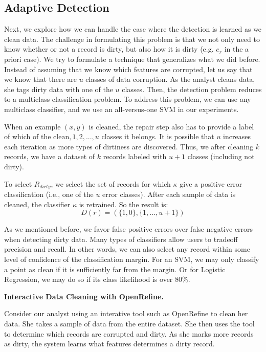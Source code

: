 \subsection{Adaptive Detection}
Next, we explore how we can handle the case where the detection is learned as we clean data.
The challenge in formulating this problem is that we not only need to know whether or not a record is dirty, but also how it is dirty (e.g. $e_r$ in the a priori case).
We try to formulate a technique that generalizes what we did before.
Instead of assuming that we know which features are corrupted, let us say that we know that there are $u$ classes of data corruption.
As the analyst cleans data, she tags dirty data with one of the $u$ classes.
Then, the detection problem reduces to a multiclass classification problem.
To address this problem, we can use any multiclass classifier, and we use an all-versus-one SVM in our experiments.

When an example $(x,y)$ is cleaned, the repair step also has to provide a label of which of the ${\text{clean}, 1,2,...,u}$ classes it belongs. It is possible that $u$ increases each iteration as more types of dirtiness are discovered. 
Thus, we after cleaning $k$ records, we have a dataset of $k$ records labeled with $u+1$ classes (including not dirty).

\begin{definition}
To select $R_{dirty}$, we select the set of records for which $\kappa$ give a positive error classification (i.e., one of the $u$ error classes).
After each sample of data is cleaned, the classifier $\kappa$ is retrained.
So the result is:
\[D(r) = (\{1,0\},\{1,...,u+1\})\]
\end{definition}

As we mentioned before, we favor false positive errors over false negative errors when detecting dirty data.
Many types of classifiers allow users to tradeoff precision and recall.
In other words, we can also select any record within some level of confidence of the classification margin.
For an SVM, we may only classify a point as clean if it is sufficiently far from the margin.
Or for Logistic Regression, we may do so if its class likelihood is over 80\%.

\vspace{0.5em}

\noindent\textbf{Interactive Data Cleaning with OpenRefine.}
\begin{example}
Consider our analyst using an interative tool such as OpenRefine \cite{openrefine} to clean her data. 
She takes a sample of data from the entire dataset.
She then uses the tool to determine which records are corrupted and dirty.
As she marks more records as dirty, the system learns what features determines a dirty record.
\end{example}